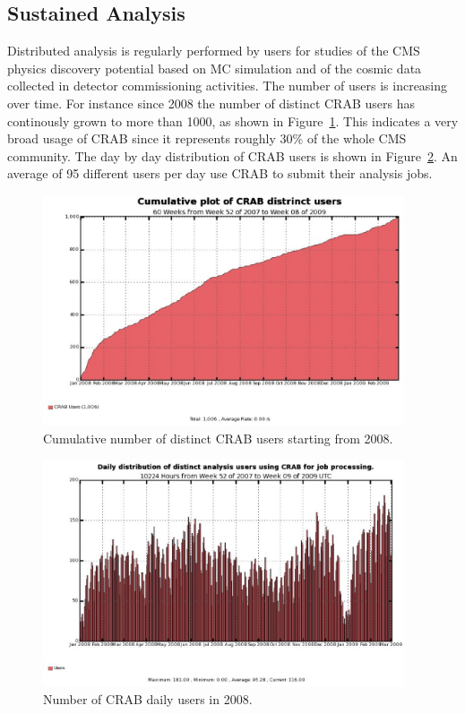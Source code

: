 \subsection{Sustained Analysis}
\label{sec:5_2}

Distributed analysis is regularly performed by users for studies of the CMS physics discovery potential based on MC simulation and of the cosmic data collected in detector commissioning activities.
The number of users is increasing over time. For instance since 2008 the number of distinct CRAB users has continously grown to more than 1000, as shown in Figure~\ref{fig:intuser}. This indicates a very broad usage of CRAB since it represents roughly 30\% of the whole CMS community.
The day by day distribution of CRAB users is shown in Figure~\ref{fig:distusers}. An average of 95 different users per day use CRAB to submit their analysis 
jobs. 

\begin{figure}
\centering
\includegraphics[width=0.95\textwidth]{UserInteg.eps}
\caption{Cumulative number of distinct CRAB users starting from 2008. }
\label{fig:intuser}
\end{figure}
\begin{figure}
\centering
\includegraphics[width=0.95\textwidth]{crabusersdaily.eps}
\caption{Number of CRAB daily users in 2008. }
\label{fig:distusers}
\end{figure}


